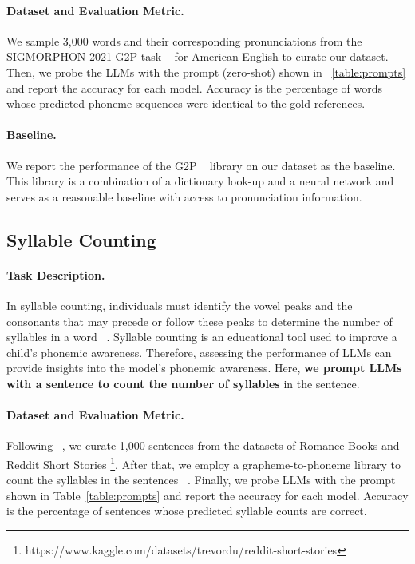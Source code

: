 \paragraph{Dataset and Evaluation Metric.} We sample 3,000 words and their corresponding pronunciations from the SIGMORPHON 2021 G2P task ~\citep{ashby2021results} for American English to curate our dataset. Then, we probe the LLMs with the prompt (zero-shot) shown in ~\autoref{table:prompts} and report the accuracy for each model. Accuracy is the percentage of words whose predicted phoneme sequences were identical to the gold references. 

\paragraph{Baseline.} We report the performance of the G2P ~\citep{g2pE2019} library on our dataset as the baseline. This library is a combination of a dictionary look-up and a neural network and serves as a reasonable baseline with access to pronunciation information. 

\subsection{Syllable Counting}
\label{sec:syllable}
\paragraph{Task Description.} In syllable counting, individuals must identify the vowel peaks and the consonants that may precede or follow these peaks to determine the number of syllables in a word ~\citep{bruck1995phonological}. Syllable counting is an educational tool used to improve a child's phonemic awareness. Therefore, assessing the performance of LLMs can provide insights into the model's phonemic awareness. Here, \textbf{we prompt LLMs with a sentence to count the number of syllables} in the sentence. 

\paragraph{Dataset and Evaluation Metric.} Following ~\citep{sun2023evaluating}, we curate 1,000 sentences from the datasets of Romance Books and Reddit Short Stories \footnote{https://www.kaggle.com/datasets/trevordu/reddit-short-stories}. After that, we employ a grapheme-to-phoneme library to count the syllables in the sentences ~\citep{g2pE2019}. Finally, we probe LLMs with the prompt shown in Table~\ref{table:prompts} and report the accuracy for each model. Accuracy is the percentage of sentences whose predicted syllable counts are correct. 

